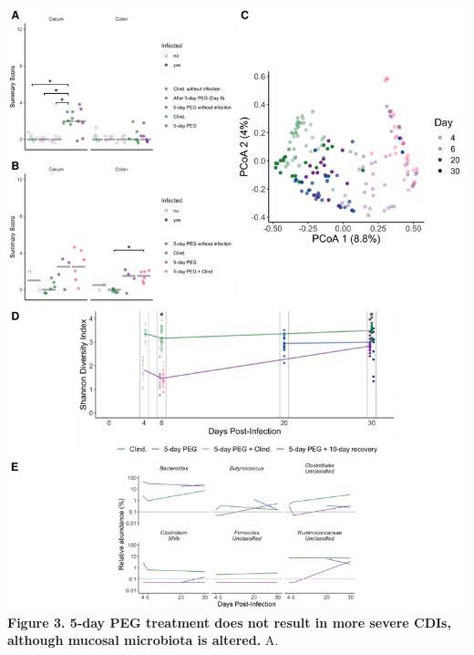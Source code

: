 \documentclass[
  11pt,
]{article}
\begin{document}
\includegraphics{figure_3.pdf} \textbf{Figure 3. 5-day PEG treatment
does not result in more severe CDIs, although mucosal microbiota is
altered.} A. \newpage
\end{document}
